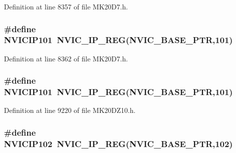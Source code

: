 Definition at line 8357 of file M\+K20\+D7.\+h.

\subsubsection[{\texorpdfstring{N\+V\+I\+C\+I\+P101}{NVICIP101}}]{\setlength{\rightskip}{0pt plus 5cm}\#define N\+V\+I\+C\+I\+P101~{\bf N\+V\+I\+C\+\_\+\+I\+P\+\_\+\+R\+EG}({\bf N\+V\+I\+C\+\_\+\+B\+A\+S\+E\+\_\+\+P\+TR},101)}\hypertarget{group___n_v_i_c___register___accessor___macros_ga3abc64f611789aa81aad805a9670dcc4}{}\label{group___n_v_i_c___register___accessor___macros_ga3abc64f611789aa81aad805a9670dcc4}


Definition at line 8362 of file M\+K20\+D7.\+h.

\subsubsection[{\texorpdfstring{N\+V\+I\+C\+I\+P101}{NVICIP101}}]{\setlength{\rightskip}{0pt plus 5cm}\#define N\+V\+I\+C\+I\+P101~{\bf N\+V\+I\+C\+\_\+\+I\+P\+\_\+\+R\+EG}({\bf N\+V\+I\+C\+\_\+\+B\+A\+S\+E\+\_\+\+P\+TR},101)}\hypertarget{group___n_v_i_c___register___accessor___macros_ga3abc64f611789aa81aad805a9670dcc4}{}\label{group___n_v_i_c___register___accessor___macros_ga3abc64f611789aa81aad805a9670dcc4}


Definition at line 9220 of file M\+K20\+D\+Z10.\+h.

\subsubsection[{\texorpdfstring{N\+V\+I\+C\+I\+P102}{NVICIP102}}]{\setlength{\rightskip}{0pt plus 5cm}\#define N\+V\+I\+C\+I\+P102~{\bf N\+V\+I\+C\+\_\+\+I\+P\+\_\+\+R\+EG}({\bf N\+V\+I\+C\+\_\+\+B\+A\+S\+E\+\_\+\+P\+TR},102)}\hypertarget{group___n_v_i_c___register___accessor___macros_gad311dfb6dc903f34f59d2be357d1e4fa}{}\label{group___n_v_i_c___register___accessor___macros_gad311dfb6dc903f34f59d2be357d1e4fa}


